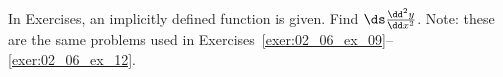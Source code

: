 \begin{exerciseset}{In Exercises}{, an implicitly defined function is given. Find $\ds \frac{\dd^2y}{\dd x^2}$. Note: these are the same problems used in Exercises~\ref{exer:02_06_ex_09}--\ref{exer:02_06_ex_12}.}





\end{exerciseset}
